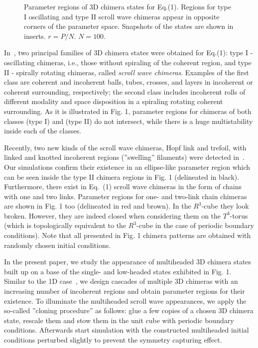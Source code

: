 \documentclass[epjST]{svjour}
\begin{document}
\begin{figure}[h]
\caption{Parameter regions of 3D chimera states for Eq.(1). Regions for type I oscillating  and type II scroll wave chimeras appear in opposite corners of the parameter space.   
 Snapshots  of the states are shown in inserts. $r = P/N$. $N=100$.} 
 \label{fig:1}
\end{figure} 






In~\cite{msom2015}, two principal families of 3D chimera states were obtained for Eq.(1): type I - oscillating chimeras, i.e., those without spiraling of the coherent region, and type II - spirally rotating chimeras, called {\it scroll wave chimeras}. Examples of the first class are coherent and incoherent balls, tubes, crosses, and layers in incoherent or coherent surrounding, respectively; the second class includes incoherent rolls of different modality and space disposition in a spiraling rotating coherent surrounding.   As it is illustrated in Fig. 1, parameter regions for chimeras of both classes (type I) and (type II)  do not intersect,  while there is a huge multistability inside each of the classes.  

Recently, two new kinds of the scroll wave chimeras, Hopf link and trefoil,  with linked and knotted incoherent regions (''swelling'' filaments) were detected in~\cite{ld2016}.  Our simulations confirm their existence in an ellipse-like parameter region which can be seen inside the type II chimera regions in Fig. 1 (delineated in black). Furthermore,  there exist in Eq.~(1)  scroll wave chimeras in the form of chains with one and two links. Parameter regions for one- and two-link chain chimeras are shown in Fig. 1 too (delineated in red and brown).  In the $R^3$-cube they look broken. However, they are indeed closed when considering them on the $T^3$-torus (which is topologically equivalent to the $R^3$-cube in the case of periodic boundary conditions).  
Note that all presented in Fig. 1 chimera patterns  are obtained with randomly chosen initial conditions. 

In the present paper, we study the appearance of multiheaded 3D chimera states built up on a base
of the single- and low-headed states exhibited in Fig. 1.   Similar to the 1D case~\cite{mvslm2014},  we design cascades of multiple 3D chimeras  with an increasing number of incoherent regions and obtain parameter regions for their existence.  To illuminate the multiheaded scroll wave  appearances, we apply the so-called  ''cloning procedure'' as follows:  glue a few copies of a chosen 3D chimera state, rescale them and stow them in the unit cube with periodic boundary conditions. Afterwards start simulation with the constructed multiheaded initial conditions perturbed slightly to prevent the symmetry capturing effect.
\end{document}

